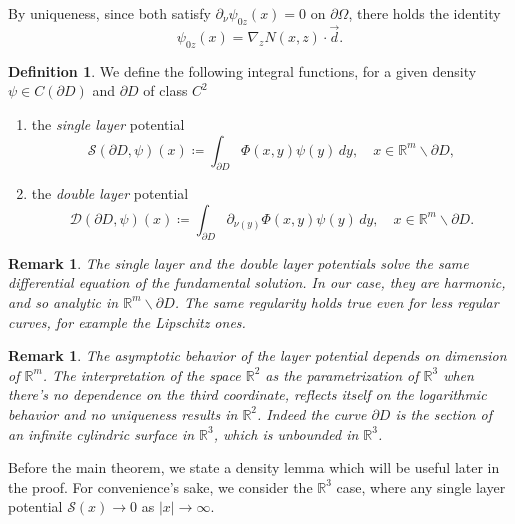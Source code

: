 \documentclass[10pt, a4paper, twoside, openright]{book}
\theoremstyle{definition}
\newtheorem{definition}[subsection]{Definition}
\theoremstyle{plain}
\theoremstyle{plain}
\theoremstyle{plain}
\theoremstyle{plain}
\newtheorem{remark}[subsection]{Remark}
\theoremstyle{plain}
\theoremstyle{plain}
\theoremstyle{plain}
\theoremstyle{plain}
\begin{document}
 By uniqueness, since both satisfy $\partial_\nu\psi_{0z}(x)=0$ on $\partial \Omega$, there holds the identity
 \begin{equation}
  \psi_{0z}(x) = \nabla_zN(x,z) \cdot \vec{d}.
 \end{equation}
 \begin{definition}
 We define the following integral functions, for a given density $\psi\in C(\partial D)$ and $\partial D$ of class $C^2$
 \begin{enumerate}
  \item the \emph{single layer} potential
   \begin{equation}
    \mathcal{S}(\partial D,\psi)(x)\coloneqq \int_{\partial D} \Phi(x, y)\psi(y)\, dy,\quad x\in\mathbb{R}^m \backslash\partial D, \label{eq:definition-single-layer}
   \end{equation}
  \item the \emph{double layer} potential
   \begin{equation}
    \mathcal{D}(\partial D,\psi)(x)\coloneqq \int_{\partial D} \partial_{\nu(y)}\Phi(x, y)\psi(y)\, dy,\quad x\in\mathbb{R}^m \backslash\partial D. \label{eq:definition-double-layer}
   \end{equation}
 \end{enumerate}
\end{definition}
\begin{remark}
The single layer and the double layer potentials solve the same differential equation of the fundamental solution. In our case, they are harmonic, and so analytic in $\mathbb{R}^m\backslash \partial D$. The same regularity holds true even for less regular curves, for example the Lipschitz ones.
\end{remark}
\begin{remark}
\label{rem:dimension}
The asymptotic behavior of the layer potential depends on dimension of $\mathbb{R}^m$.
The interpretation of the space $\mathbb{R}^2$ as the parametrization of $\mathbb{R}^3$ 
when there's no dependence on the third coordinate, reflects itself on the logarithmic 
behavior and no uniqueness results in $\mathbb{R}^2$. Indeed the curve $\partial D$ is the section of an infinite cylindric surface in $\mathbb{R}^3$, which is unbounded in $\mathbb{R}^3$.
\end{remark}
 Before the main theorem, we state a density lemma which will be useful later in the proof. For convenience's sake, we consider the $\mathbb{R}^3$ case, 
 where any single layer potential $\mathcal{S}(x)\to0$ as $|x|\to \infty$.
 \par
\end{document}
